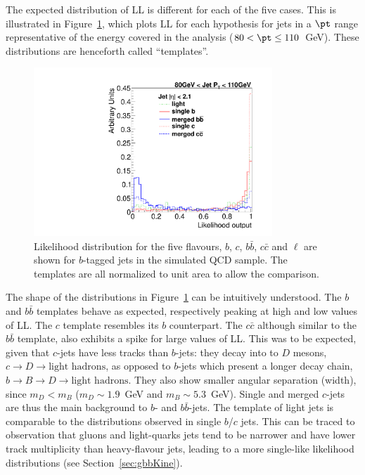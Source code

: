 The expected distribution of LL is different for each of the five cases. This is illustrated in Figure~\ref{fig:templates}, which plots LL for each hypothesis for jets in a $\pt$ range representative of the energy covered in the analysis ($80<\pt\leq110$~GeV). These distributions are henceforth called ``templates''. 
\begin{figure}[htb]
\centering
\includegraphics[width=0.80\textwidth]{FIGS/Fits/AllTemplates080.pdf}
\caption{Likelihood distribution for the five flavours, $b$, $c$, $b\bar{b}$, $c\bar{c}$ and $\ell$ are shown for $b$-tagged jets in the simulated QCD sample. The templates are all normalized to unit area to allow the comparison.}
\label{fig:templates}
\end{figure}
The shape of the distributions in Figure~\ref{fig:templates} can be intuitively understood. The $b$ and $b\bar{b}$ templates behave as expected, respectively peaking at high and low values of LL. The $c$ template resembles its $b$ counterpart. The $c\bar{c}$ although similar to the $b\bar{b}$ template, also exhibits a spike for large values of LL.  
This was to be expected, given that $c$-jets have less tracks than $b$-jets: they decay into to $D$ mesons, $c \rightarrow D \rightarrow \mbox{light hadrons}$, as opposed to $b$-jets which present a longer decay chain, $b \rightarrow B \rightarrow D\rightarrow \mbox{light hadrons}$. They also show smaller angular separation (width), since $m_D < m_B$  ($m_D\sim 1.9$~GeV and $m_B \sim 5.3$~GeV).
Single and merged $c$-jets are thus the main background to $b$- and $b\bar{b}$-jets. The template of light jets  %
is comparable to the distributions observed in single $b$/$c$ jets. This can be traced to observation that gluons and light-quarks jets tend to be narrower and have lower track multiplicity than heavy-flavour jets, leading to a more single-like likelihood distributions (see Section~\ref{sec:gbbKine}).


